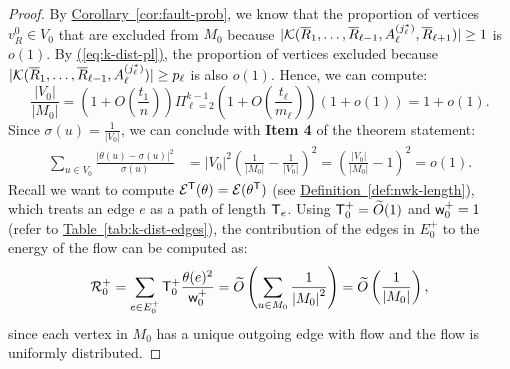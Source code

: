 \documentclass{article}
\newcommand{\eq}[1]{\hyperref[eq:#1]{(\ref*{eq:#1})}}
\newcommand{\cor}[1]{\hyperref[cor:#1]{Corollary~\ref*{cor:#1}}}
\newcommand{\tabl}[1]{\hyperref[tab:#1]{Table~\ref*{tab:#1}}}
\newcommand{\defin}[1]{\hyperref[def:#1]{Definition~\ref*{def:#1}}}
\renewcommand{\>}{\rangle}
\newcommand{\<}{\langle}
\renewcommand{\(}{\left(}
\renewcommand{\)}{\right)}
\def\abs#1{\left| #1 \right|}
\def\w{{\sf w}}
\begin{document}
\begin{proof}
		By \cor{fault-prob}, we know that the proportion of vertices $v_R^0\in V_0$ that are excluded from $M_0$ because 
		$|{\cal K}(\overline{R}_1,\dots,\overline{R}_{\ell-1},A_{\ell}^{(j_{\ell}^*)},\overline{R}_{\ell+1})| \geq 1$ is $o(1)$. 
By \eq{k-dist-pl}, the proportion of vertices excluded because $|{\cal K}(\overline{R}_1,\dots,\overline{R}_{\ell-1},A_{\ell}^{(j_{\ell}^*)})|\geq p_{\ell}$ is also $o(1)$. 
Hence, we can compute:
		\begin{equation*}
			\frac{\abs{V_0}}{\abs{M_0}} = \left(1+O\left(\frac{t_1}{n}\right)\right)\Pi_{\ell=2}^{k-1}\left(1+O\left(\frac{t_\ell}{m_\ell}\right)\right)\left(1 + o(1)\right) = 1+o(1).
		\end{equation*}
		Since $\sigma(u)=\frac{1}{\abs{V_0}}$, we can conclude with \textbf{Item 4} of the theorem statement:
		\begin{equation*}
			\begin{split}
				\sum_{u\in V_0}\frac{|\theta(u)-\sigma(u)|^2}{\sigma(u)} 
				&= \abs{V_0}^2\left(\frac{1}{\abs{M_0}}-\frac{1}{\abs{V_0}}\right)^2
				= \left(\frac{\abs{V_0}}{\abs{M_0}}-1\right)^2=o(1).
			\end{split}
		\end{equation*}
Recall we want to compute ${\cal E}^{\sf T}(\theta)={\cal E}(\theta^{\sf T})$ (see \defin{nwk-length}), which treats an edge $e$ as a path of length ${\sf T}_{e}$.
Using ${\sf T}_0^+=\widetilde{O}(1)$ and $\w_0^+=1$ (refer to \tabl{k-dist-edges}), the contribution of the edges in $E_0^{+}$ to the energy of the flow can be computed as:
		\begin{equation}
			{\cal R}_0^+ = \sum_{e\in E_0^+}{\sf T}_0^+\frac{\theta(e)^2}{\w_0^+} = \widetilde{O}\left(\sum_{u\in M_0}\frac{1}{\abs{M_0}^2}\right)=\widetilde{O}\left(\frac{1}{\abs{M_0}}\right),\label{eq:k-R0+}
		\end{equation}
		since each vertex in $M_0$ has a unique outgoing edge with flow and the flow is uniformly distributed.


\end{proof}
\end{document}
